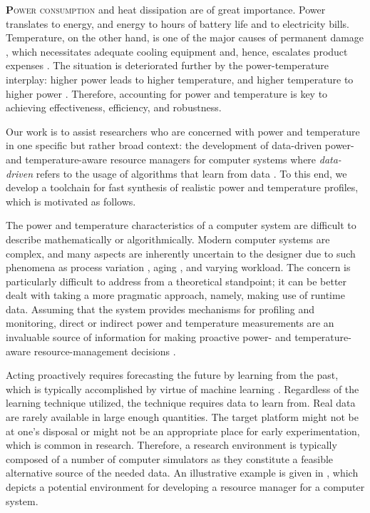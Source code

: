 \lettrine[findent=0.3em, nindent=0em]{\textbf{P}}{ower consumption} and heat
dissipation are of great importance. Power translates to energy, and energy to
hours of battery life and to electricity bills. Temperature, on the other hand,
is one of the major causes of permanent damage \cite{jedec}, which necessitates
adequate cooling equipment and, hence, escalates product expenses
\cite{chaudhry2015}. The situation is deteriorated further by the
power-temperature interplay: higher power leads to higher temperature, and
higher temperature to higher power \cite{liu2007}. Therefore, accounting for
power and temperature is key to achieving effectiveness, efficiency, and
robustness.

Our work is to assist researchers who are concerned with power and temperature
in one specific but rather broad context: the development of data-driven power-
and temperature-aware resource managers for computer systems where
\emph{data-driven} refers to the usage of algorithms that learn from data
\cite{bishop2006}. To this end, we develop a toolchain for fast synthesis of
realistic power and temperature profiles, which is motivated as follows.

The power and temperature characteristics of a computer system are difficult to
describe mathematically or algorithmically. Modern computer systems are complex,
and many aspects are inherently uncertain to the designer due to such phenomena
as process variation \cite{chandrakasan2000}, aging \cite{coskun2006}, and
varying workload. The concern is particularly difficult to address from a
theoretical standpoint; it can be better dealt with taking a more pragmatic
approach, namely, making use of runtime data. Assuming that the system provides
mechanisms for profiling and monitoring, direct or indirect power and
temperature measurements are an invaluable source of information for making
proactive power- and temperature-aware resource-management decisions
\cite{chaudhry2015, coskun2008}.


Acting proactively requires forecasting the future by learning from the past,
which is typically accomplished by virtue of machine learning \cite{bishop2006}.
Regardless of the learning technique utilized, the technique requires data to
learn from. Real data are rarely available in large enough quantities. The
target platform might not be at one's disposal or might not be an appropriate
place for early experimentation, which is common in research. Therefore, a
research environment is typically composed of a number of computer simulators as
they constitute a feasible alternative source of the needed data. An
illustrative example is given in , which depicts a potential
environment for developing a resource manager for a computer system.

